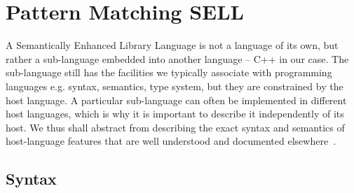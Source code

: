 \section{Pattern Matching SELL} %
\label{sec:pm}

A Semantically Enhanced Library Language is not a language of its own, but 
rather a sub-language embedded into another language -- C++ in our case. The 
sub-language still has the facilities we typically associate with programming 
languages e.g. syntax, semantics, type system, but they are constrained by
the host language. A particular sub-language can often be implemented in 
different host languages, which is why it is important to describe it 
independently of its host. We thus shall abstract from describing the 
exact syntax and semantics of host-language features that are well understood and documented 
elsewhere~\cite{C++11}.

\subsection{Syntax}
\label{sec:syn}

